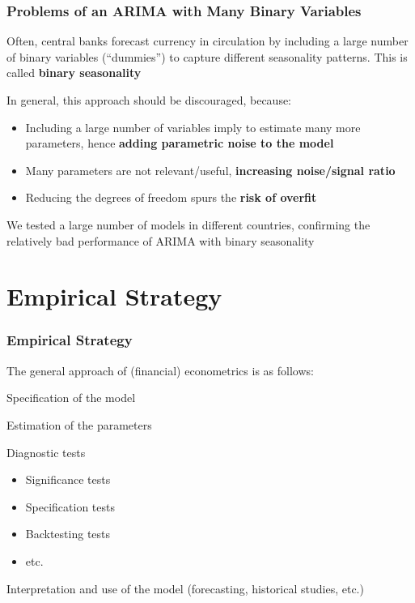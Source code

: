 \documentclass{beamer}
\newenvironment{wideitemize}{\itemize\addtolength{\itemsep}{10pt}}{\enditemize}
\newenvironment{wideenumerate}{\enumerate\addtolength{\itemsep}{10pt}}{\endenumerate}
\begin{document}
\begin{frame}
  \frametitle{Problems of an ARIMA with Many Binary Variables}

  \begin{wideitemize}
  \item Often, central banks forecast currency in circulation by including a large number of binary variables (“dummies”) to capture different seasonality patterns. This is called \textbf{binary seasonality}

  \item In general, this approach should be discouraged, because:
    \begin{itemize}
    \item Including a large number of variables imply to estimate many more parameters, hence \textbf{adding parametric noise to the model}
    \item Many parameters are not relevant/useful, \textbf{increasing noise/signal ratio}
    \item Reducing the degrees of freedom spurs the \textbf{risk of overfit}
    \end{itemize}
    
  \item We tested a large number of models in different countries, confirming the relatively bad performance of ARIMA with binary seasonality
    
  \end{wideitemize}

\end{frame}


\section{Empirical Strategy}

\begin{frame}
  \frametitle{Empirical Strategy}
  The general approach of (financial) econometrics is as follows:\\
  \smallskip

  \begin{wideenumerate}
  \item Specification of the model
  \item Estimation of the parameters
  \item Diagnostic tests
    \begin{itemize}
    \item Significance tests
    \item Specification tests
    \item Backtesting tests
    \item etc.
    \end{itemize}
  \item Interpretation and use of the model (forecasting, historical studies, etc.)
  \end{wideenumerate}
\end{frame}
\end{document}
